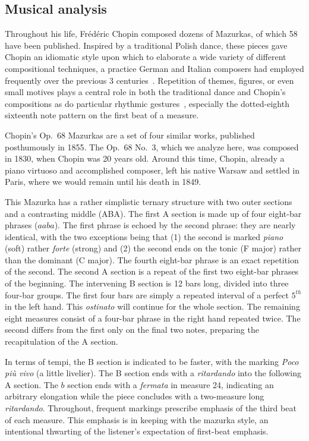 \documentclass[aoas]{imsart}
\begin{document}
\subsection{Musical analysis}
\label{sec:musical-analysis}

Throughout his life, Fr\'ed\'eric Chopin composed dozens of Mazurkas,
of which 58 have been published. Inspired by a traditional Polish
dance, these pieces gave Chopin an idiomatic style upon which to
elaborate a wide variety of different compositional techniques, a
practice German and Italian composers had employed frequently over the previous 3
centuries~\citep{BurkholderGrout2014}. Repetition of themes, figures, or even small motives plays
a central role in both the traditional dance and Chopin's compositions
as do particular rhythmic gestures~\citep{Kallberg1996}, especially the
dotted-eighth sixteenth note pattern on the first beat of a measure. 

Chopin's Op.\ 68 Mazurkas are a set of four similar works, published
posthumously in 1855. The Op.\ 68 No.\ 3, which we analyze here, was
composed in 1830, when Chopin was 20 years old. Around this time,
Chopin, already a piano virtuoso and accomplished composer, left his
native Warsaw and settled in Paris, where we would remain until his
death in 1849.

This Mazurka has a rather simplistic ternary structure with two outer
sections and a contrasting middle (ABA). The first A section is made
up of four eight-bar phrases ($aaba$). The first phrase is echoed by the
second phrase: they are nearly identical, with the two exceptions
being that (1) the
second is marked {\em piano} (soft) rather {\em forte} (strong) and (2)
the second ends on the tonic (F major) rather than the dominant
(C major). The fourth eight-bar phrase is an exact repetition of the
second. The second A section is a repeat of the first two
eight-bar phrases of the beginning. The intervening B section is 12
bars long, divided into three four-bar groups. The first four bars are
simply a repeated interval of a perfect $5^{th}$ in the left
hand. This {\em ostinato} will continue for the whole section. The remaining
eight measures consist of a four-bar phrase in the right hand repeated twice. The second differs from the first only on the final two notes, preparing the
recapitulation of the A section.

In terms of tempi, the B section is indicated to be faster, with the
marking {\em Poco pi\`u vivo} (a little livelier). The B section ends
with a {\em ritardando} into the following A section. The $b$ section ends
with a {\em fermata} in measure 24, indicating an arbitrary
elongation while the piece
concludes with a two-measure long {\em ritardando}. Throughout, 
frequent markings prescribe emphasis of the third beat of each measure. This
emphasis is in keeping with the mazurka style, an intentional
thwarting of the listener's expectation of first-beat emphasis.
\end{document}

